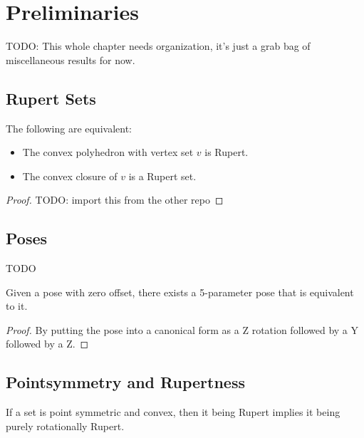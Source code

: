 \chapter{Preliminaries}

TODO: This whole chapter needs organization, it's just a grab bag of miscellaneous results for now.

\section{Rupert Sets}

\begin{theorem}
\label{thm:rupert_iff_rupert_set}
\leanok
The following are equivalent:
\begin{itemize}
\item The convex polyhedron with vertex set $v$ is Rupert.
\item The convex closure of $v$ is a Rupert set.
\end{itemize}
\end{theorem}
\begin{proof}
\leanok
TODO: import this from the other repo
\end{proof}


\section{Poses}

TODO

\begin{theorem}
\label{thm:pose_of_matrix_pose}
\leanok
Given a pose with zero offset, there exists a 5-parameter pose that is equivalent to it.
\end{theorem}

\begin{proof}
By putting the pose into a canonical form as a Z rotation followed by a Y followed by a Z.
\leanok
\end{proof}

\section{Pointsymmetry and Rupertness}

\begin{theorem}
\label{thm:rupert_implies_rot_rupert}
\leanok
If a set is point symmetric and convex, then it being Rupert implies
it being purely rotationally Rupert.
\end{theorem}

